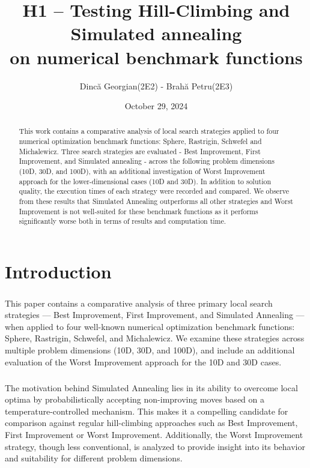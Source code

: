 \documentclass{article}
\title{H1 – Testing Hill-Climbing and Simulated annealing \\ on numerical benchmark functions}
\author{Dincă Georgian(2E2) - Brahă Petru(2E3)}
\date{October 29, 2024}
\begin{document}
\maketitle

\begin{abstract}

This work contains a comparative analysis of local search strategies applied to four numerical optimization benchmark functions: Sphere, Rastrigin, Schwefel and Michalewicz. Three search strategies are evaluated - Best Improvement, First Improvement, and Simulated annealing - across the following problem dimensions (10D, 30D, and 100D), with an additional investigation of Worst Improvement approach for the lower-dimensional cases (10D and 30D). In addition to solution quality, the execution times of each strategy were recorded and compared. We observe from these results that Simulated Annealing outperforms all other strategies and Worst Improvement is not well-suited for these benchmark functions as it performs significantly worse both in terms of results and computation time.

\end{abstract}

\section{Introduction}

\subparagraph{}
This paper contains a comparative analysis of three primary local search strategies — Best Improvement, First Improvement, and Simulated Annealing — when applied to four well-known numerical optimization benchmark functions: Sphere, Rastrigin, Schwefel, and Michalewicz. We examine these strategies across multiple problem dimensions (10D, 30D, and 100D), and include an additional evaluation of the Worst Improvement approach for the 10D and 30D cases.

\subparagraph{}
The motivation behind Simulated Annealing lies in its ability to overcome local optima by probabilistically accepting non-improving moves based on a temperature-controlled mechanism. This makes it a compelling candidate for comparison against regular hill-climbing approaches such as Best Improvement, First Improvement or Worst Improvement. Additionally, the Worst Improvement strategy, though less conventional, is analyzed to provide insight into its behavior and suitability for different problem dimensions.
\end{document}
